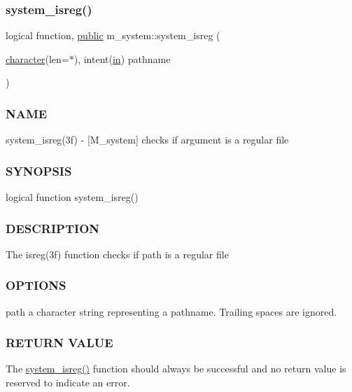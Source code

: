 \subsubsection{\texorpdfstring{system\+\_\+isreg()}{system\_isreg()}}
{\footnotesize\ttfamily logical function, \hyperlink{M__stopwatch_83_8txt_a2f74811300c361e53b430611a7d1769f}{public} m\+\_\+system\+::system\+\_\+isreg (\begin{DoxyParamCaption}\item[{\hyperlink{option__stopwatch_83_8txt_abd4b21fbbd175834027b5224bfe97e66}{character}(len=$\ast$), intent(\hyperlink{M__journal_83_8txt_afce72651d1eed785a2132bee863b2f38}{in})}]{pathname }\end{DoxyParamCaption})}



\subsubsection*{N\+A\+ME}

system\+\_\+isreg(3f) -\/ \mbox{[}M\+\_\+system\mbox{]} checks if argument is a regular file 

\subsubsection*{S\+Y\+N\+O\+P\+S\+IS}

\begin{DoxyVerb}logical function system_isreg()
\end{DoxyVerb}


\subsubsection*{D\+E\+S\+C\+R\+I\+P\+T\+I\+ON}

The isreg(3f) function checks if path is a regular file

\subsubsection*{O\+P\+T\+I\+O\+NS}

path a character string representing a pathname. Trailing spaces are ignored.

\subsubsection*{R\+E\+T\+U\+RN V\+A\+L\+UE}

The \hyperlink{namespacem__system_a127bdd84ccd4b52f3f29abbc56af029b}{system\+\_\+isreg()} function should always be successful and no return value is reserved to indicate an error.

